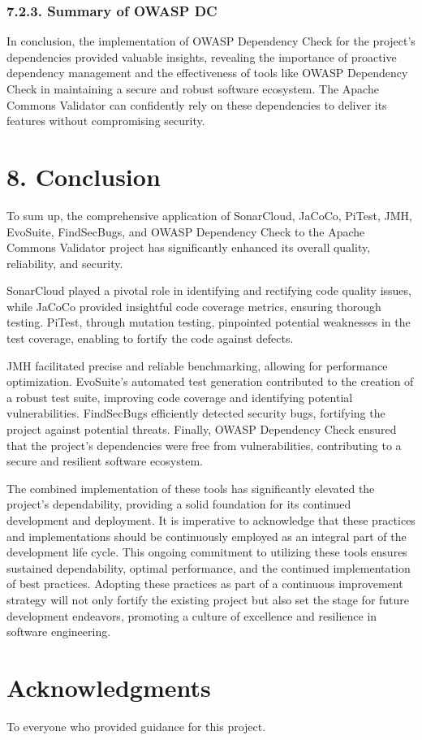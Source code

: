 \documentclass{sigchi}
\begin{document}
\subsubsection{\textbf{7.2.3. Summary of OWASP DC}}
In conclusion, the implementation of OWASP Dependency Check for the project's dependencies provided valuable insights, revealing the importance of proactive dependency management and the effectiveness of tools like OWASP Dependency Check in maintaining a secure and robust software ecosystem. The Apache Commons Validator can confidently rely on these dependencies to deliver its features without compromising security.

\section{8. Conclusion}

To sum up, the comprehensive application of SonarCloud, JaCoCo, PiTest, JMH, EvoSuite, FindSecBugs, and OWASP Dependency Check to the Apache Commons Validator project has significantly enhanced its overall quality, reliability, and security. 

SonarCloud played a pivotal role in identifying and rectifying code quality issues, while JaCoCo provided insightful code coverage metrics, ensuring thorough testing. PiTest, through mutation testing, pinpointed potential weaknesses in the test coverage, enabling to fortify the code against defects.

JMH facilitated precise and reliable benchmarking, allowing for performance optimization. EvoSuite's automated test generation contributed to the creation of a robust test suite, improving code coverage and identifying potential vulnerabilities. FindSecBugs efficiently detected security bugs, fortifying the project against potential threats. Finally, OWASP Dependency Check ensured that the project's dependencies were free from vulnerabilities, contributing to a secure and resilient software ecosystem. 

The combined implementation of these tools has significantly elevated the project's dependability, providing a solid foundation for its continued development and deployment. It is imperative to acknowledge that these practices and implementations should be continuously employed as an integral part of the development life cycle. This ongoing commitment to utilizing these tools ensures sustained dependability, optimal performance, and the continued implementation of best practices. Adopting these practices as part of a continuous improvement strategy will not only fortify the existing project but also set the stage for future development endeavors, promoting a culture of excellence and resilience in software engineering.

\section{Acknowledgments}
To everyone who provided guidance for this project.




\balance{}



\end{document}
